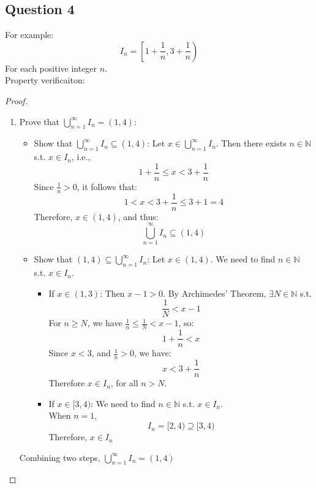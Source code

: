 \documentclass{article}
\begin{document}
\subsection*{Question 4}
For example:
\[ I_n = \left[ 1 + \frac{1}{n}, 3 + \frac{1}{n} \right) \]
For each positive integer $n$.
\\
Property verificaiton:
\begin{proof}
\hspace*{0.001cm}
\\
\begin{enumerate}
    \item Prove that \( \bigcup_{n=1}^{\infty} I_n = (1, 4) \):
    \begin{itemize}
        \item Show that \( \bigcup_{n = 1}^{\infty} I_n \subseteq (1, 4) \):
        Let \( x \in \bigcup_{n = 1}^{\infty} I_n \). Then there exists $n \in \mathbb{N}$ s.t. $x \in I_n$, i.e.,
        \[ 1 + \frac{1}{n} \leq x < 3 + \frac{1}{n} \]
        Since \( \frac{1}{n} > 0 \), it follows that:
        \[ 1 < x < 3 + \frac{1}{n} \leq 3 + 1 = 4 \]
        Therefore, \( x \in (1, 4) \), and thus:
        \[ \bigcup_{n = 1}^{\infty} I_n \subseteq (1, 4) \]
        \item Show that \( (1, 4) \subseteq \bigcup_{n = 1}^{\infty} I_n \):
        Let \( x \in (1, 4) \). We need to find $n \in \mathbb{N}$ s.t. $x \in I_n$.
        \begin{itemize}
            \item If \( x \in (1, 3) \):
            Then \(x - 1 > 0 \). By Archimedes' Theorem, \( \exists N \in \mathbb{N} \) s.t.
            \[ \frac{1}{N} < x - 1 \]
            For \( n \geq N \), we have \( \frac{1}{n} \leq \frac{1}{N} < x - 1 \), so:
            \[ 1 + \frac{1}{n} < x \]
            Since \(x < 3\), and \( \frac{1}{n} > 0 \), we have:
            \[ x < 3 + \frac{1}{n} \]
            Therefore \( x \in I_n \), for all $n > N$.
            \item If \( x \in [3, 4) \): We need to find $n \in \mathbb{N}$ s.t. $x \in I_n$.
            \\
            When $n = 1$, 
            \[ I_n = [2, 4) \supseteq [3,4) \]
            Therefore, $x \in I_n$
        \end{itemize}
    \end{itemize}
    Combining two steps, \( \bigcup_{n=1}^{\infty} I_n = (1, 4) \)


\end{enumerate}
\end{proof}
\end{document}

